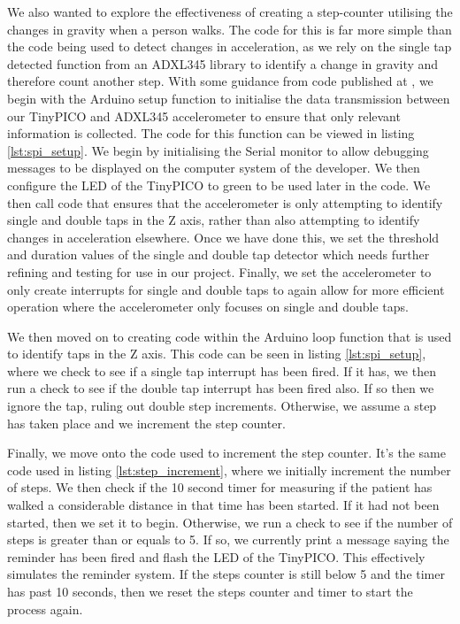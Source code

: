 {We also wanted to explore the effectiveness of creating a step-counter utilising the changes in gravity when a person walks. The code for this is far more simple than the code being used to detect changes in acceleration, as we rely on the single tap detected function from an ADXL345 library to identify a change in gravity and therefore count another step. With some guidance from code published at \cite{tiennotg}, we begin with the Arduino setup function to initialise the data transmission between our TinyPICO and ADXL345 accelerometer to ensure that only relevant information is collected. The code for this function can be viewed in listing \ref{lst:spi_setup}. We begin by initialising the Serial monitor to allow debugging messages to be displayed on the computer system of the developer. We then configure the LED of the TinyPICO to green to be used later in the code. We then call code that ensures that the accelerometer is only attempting to identify single and double taps in the Z axis, rather than also attempting to identify changes in acceleration elsewhere. Once we have done this, we set the threshold and duration values of the single and double tap detector which needs further refining and testing for use in our project. Finally, we set the accelerometer to only create interrupts for single and double taps to again allow for more efficient operation where the accelerometer only focuses on single and double taps.



We then moved on to creating code within the Arduino loop function that is used to identify taps in the Z axis. This code can be seen in listing \ref{lst:spi_setup}, where we check to see if a single tap interrupt has been fired. If it has, we then run a check to see if the double tap interrupt has been fired also. If so then we ignore the tap, ruling out double step increments. Otherwise, we assume a step has taken place and we increment the step counter.



Finally, we move onto the code used to increment the step counter. It's the same code used in listing \ref{lst:step_increment}, where we initially increment the number of steps. We then check if the 10 second timer for measuring if the patient has walked a considerable distance in that time has been started. If it had not been started, then we set it to begin. Otherwise, we run a check to see if the number of steps is greater than or equals to 5. If so, we currently print a message saying the reminder has been fired and flash the LED of the TinyPICO. This effectively simulates the reminder system. If the steps counter is still below 5 and the timer has past 10 seconds, then we reset the steps counter and timer to start the process again.

}
